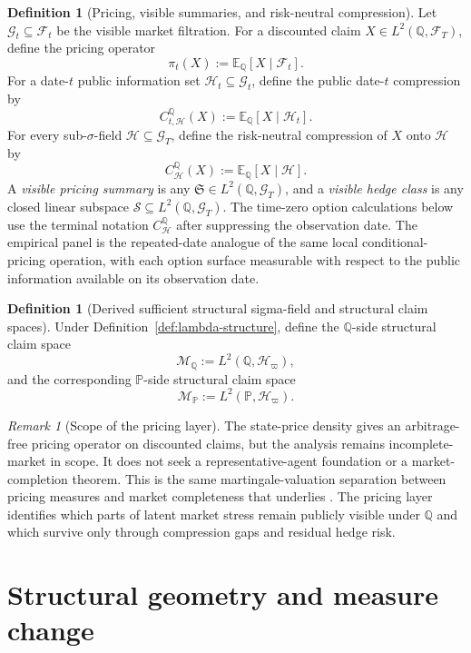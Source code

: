 \documentclass[11pt,a4paper]{amsart}
\theoremstyle{plain}
\theoremstyle{definition}
\newtheorem{definition}[theorem]{Definition}
\theoremstyle{remark}
\newtheorem{remark}[theorem]{Remark}
\newcommand{\PP}{\mathbb{P}}
\newcommand{\QQ}{\mathbb{Q}}
\newcommand{\EE}{\mathbb{E}}
\newcommand{\cF}{\mathcal{F}}
\newcommand{\cG}{\mathcal{G}}
\newcommand{\cH}{\mathcal{H}}
\newcommand{\cM}{\mathcal{M}}
\newcommand{\cS}{\mathcal{S}}
\begin{document}
\begin{definition}[Pricing, visible summaries, and risk-neutral compression]\label{def:compression}
Let \(\cG_t\subseteq \cF_t\) be the visible market filtration.  For a discounted claim
\(X\in L^2(\QQ,\cF_T)\), define the pricing operator
\[
        \pi_t(X):=\EE_{\QQ}[X\mid \cF_t].
\]
For a date-\(t\) public information set \(\cH_t\subseteq\cG_t\), define the public date-\(t\)
compression by
\[
        C_{t,\cH}^{\QQ}(X):=\EE_{\QQ}[X\mid\cH_t].
\]
For every sub-\(\sigma\)-field \(\cH\subseteq \cG_T\), define the risk-neutral compression of
\(X\) onto \(\cH\) by
\[
        C^\QQ_{\cH}(X):=\EE_{\QQ}[X\mid \cH].
\]
A \emph{visible pricing summary} is any \(\mathfrak S\in L^2(\QQ,\cG_T)\), and a
\emph{visible hedge class} is any closed linear subspace \(\cS\subseteq L^2(\QQ,\cG_T)\).
The time-zero option calculations below use the terminal notation \(C_{\cH}^{\QQ}\) after
suppressing the observation date.  The empirical panel is the repeated-date analogue of the same
local conditional-pricing operation, with each option surface measurable with respect to the public
information available on its observation date.
\end{definition}

\begin{definition}[Derived sufficient structural sigma-field and structural claim spaces]\label{def:mode-space}
Under Definition~\ref{def:lambda-structure}, define the \(\QQ\)-side structural claim space
\[
        \cM_\QQ:=L^2(\QQ,\cH_\varpi),
\]
and the corresponding \(\PP\)-side structural claim space
\[
        \cM_\PP:=L^2(\PP,\cH_\varpi).
\]
\end{definition}

\begin{remark}[Scope of the pricing layer]
The state-price density gives an arbitrage-free pricing operator on discounted claims, but the
analysis remains incomplete-market in scope.  It does not seek a representative-agent
foundation or a market-completion theorem.  This is the same martingale-valuation separation
between pricing measures and market completeness that underlies
\cite{harrisonKreps1979,delbaen1994,karatzasShreve1998}.  The pricing layer identifies which
parts of latent market stress remain publicly visible under \(\QQ\) and which survive only through
compression gaps and residual hedge risk.
\end{remark}

\section{Structural geometry and measure change}\label{sec:geom}
\end{document}
